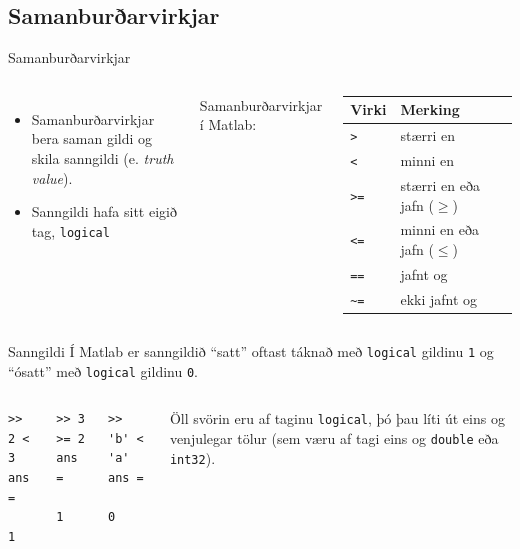 \documentclass{beamer}
\begin{document}
\subsection{Samanburðarvirkjar}
\begin{frame}{Samanburðarvirkjar}
\begin{columns}
\begin{itemize}
 \item Samanburðarvirkjar bera saman gildi og skila sanngildi (e. \emph{truth value}).
 \item Sanngildi hafa sitt eigið tag, \texttt{logical}\footnotemark
\end{itemize}

\vspace{0.5cm}
Samanburðarvirkjar í Matlab: 

\vspace{0.2cm}
\begin{tabular}{ll}
\toprule
Virki&Merking\\
\midrule
\texttt{>}&stærri en\\
\texttt{<}&minni en\\
\texttt{>=}&stærri en eða jafn ($\geq$)\\
\texttt{<=}&minni en eða jafn ($\leq$)\\
\texttt{==}&jafnt og\\
\texttt{\~}\texttt{=}&ekki jafnt og\\
\bottomrule
\end{tabular}
\end{columns}
\end{frame}

\begin{frame}[fragile]{Sanngildi}
Í Matlab er sanngildið ``satt'' oftast táknað með \texttt{logical} gildinu \texttt{1} og ``ósatt'' með \texttt{logical} gildinu \texttt{0}.
\begin{columns}
\begin{verbatim}
>> 2 < 3
ans =
     1
\end{verbatim}
\begin{verbatim}
>> 3 >= 2
ans =
     1
\end{verbatim}
\begin{verbatim}
>> 'b' < 'a'
ans =
     0
\end{verbatim}

\vspace{0.09cm}
Öll svörin eru af taginu \texttt{logical}, þó þau líti út eins og venjulegar tölur (sem væru af tagi eins og \texttt{double} eða \texttt{int32}).
\end{columns}
\end{frame}
\end{document}
